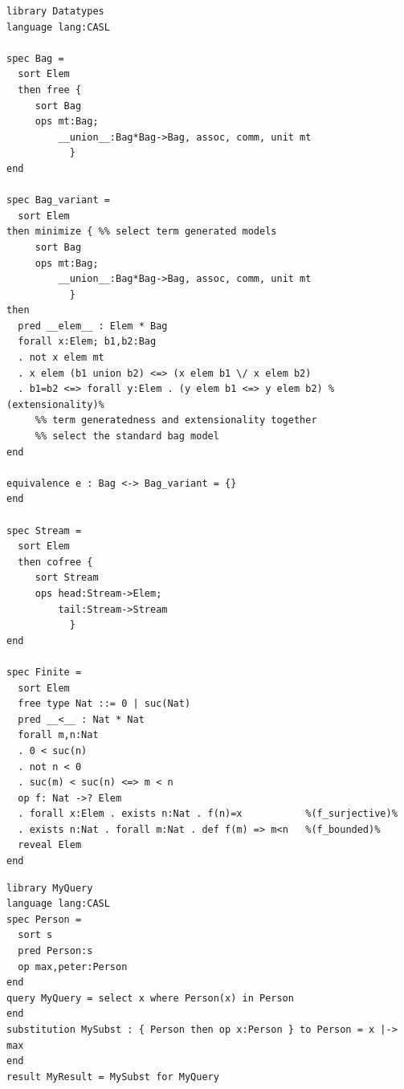 \documentclass[10pt, a4paper]{isov2}
\begin{document}
\label{ex:datatypes}

\begin{lstlisting}[basicstyle=\ttfamily,language=dolText,alsolanguage=CASL,escapechar=@,mathescape]
%prefix( lang:  <http://purl.net/DOL/languages/> )%
library Datatypes
language lang:CASL

spec Bag =
  sort Elem
  then free {
     sort Bag
     ops mt:Bag;
         __union__:Bag*Bag->Bag, assoc, comm, unit mt
           }
end

spec Bag_variant =
  sort Elem
then minimize { %% select term generated models
     sort Bag
     ops mt:Bag;
         __union__:Bag*Bag->Bag, assoc, comm, unit mt
           }
then	   
  pred __elem__ : Elem * Bag
  forall x:Elem; b1,b2:Bag
  . not x elem mt
  . x elem (b1 union b2) <=> (x elem b1 \/ x elem b2)
  . b1=b2 <=> forall y:Elem . (y elem b1 <=> y elem b2) %(extensionality)%
     %% term generatedness and extensionality together
     %% select the standard bag model
end

equivalence e : Bag <-> Bag_variant = {}
end

spec Stream =
  sort Elem
  then cofree {
     sort Stream
     ops head:Stream->Elem;
         tail:Stream->Stream
           }
end

spec Finite =
  sort Elem
  free type Nat ::= 0 | suc(Nat)
  pred __<__ : Nat * Nat
  forall m,n:Nat
  . 0 < suc(n)
  . not n < 0
  . suc(m) < suc(n) <=> m < n
  op f: Nat ->? Elem
  . forall x:Elem . exists n:Nat . f(n)=x           %(f_surjective)%
  . exists n:Nat . forall m:Nat . def f(m) => m<n   %(f_bounded)%
  reveal Elem
end

\end{lstlisting}

\label{ex:queries}
\begin{lstlisting}[basicstyle=\ttfamily,language=dolText,alsolanguage=CASL,escapechar=@,mathescape]
%prefix( lang:  <http://purl.net/DOL/languages/> )%
library MyQuery
language lang:CASL
spec Person =
  sort s
  pred Person:s 
  op max,peter:Person
end
query MyQuery = select x where Person(x) in Person
end
substitution MySubst : { Person then op x:Person } to Person = x |-> max
end
result MyResult = MySubst for MyQuery
\end{lstlisting}


\end{document}
